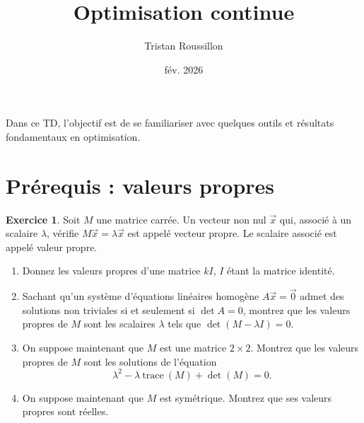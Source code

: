 \documentclass[a4paper,francais]{article}
\title{Optimisation continue}
\author{Tristan Roussillon}
\date{fév. 2026}
\theoremstyle{definition}
\newtheorem{exercice}{Exercice}[section]
\begin{document}
\maketitle

Dans ce TD, l'objectif est de se familiariser
avec quelques outils et résultats fondamentaux
en optimisation.  

\section{Prérequis : valeurs propres}
\label{sec:calcul}

\begin{exercice}
  Soit $M$ une matrice carrée. Un vecteur non nul $\vec{x}$ qui, associé
  à un scalaire $\lambda$, vérifie $M\vec{x} = \lambda \vec{x}$ est appelé
  vecteur propre. Le scalaire associé est appelé valeur propre.

  \begin{enumerate}
  \item Donnez les valeurs propres d'une matrice $kI$, $I$ étant la matrice identité. 
  \item Sachant qu'un système d'équations linéaires homogène $A\vec{x} = \vec{0}$ admet des
    solutions non triviales si et seulement si $\det{A} = 0$, montrez que les valeurs propres
    de $M$ sont les scalaires $\lambda$ tels que $\det{(M - \lambda I)} = 0$. 
  \item On suppose maintenant que $M$ est une matrice $2 \times 2$. Montrez que
    les valeurs propres de $M$ sont les solutions de l'équation
    \[ \lambda^2 - \lambda \ \text{trace} \ (M) + \det{(M)} = 0.\]
  \item On suppose maintenant que $M$ est symétrique.
    Montrez que ses valeurs propres sont réelles. 
  \end{enumerate}
  
\end{exercice}
\end{document}
